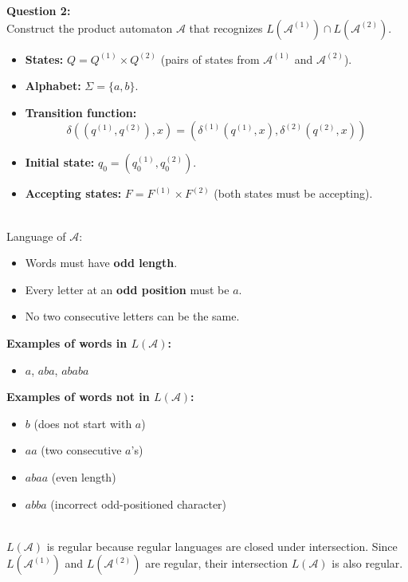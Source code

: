 \documentclass{article}
\theoremstyle{theorem}
\theoremstyle{definition}
\theoremstyle{remark}
\begin{document}
\smallskip

\textbf{Question 2: } \\ 
Construct the product automaton \( \mathcal{A} \) that recognizes \( L(\mathcal{A}^{(1)}) \cap L(\mathcal{A}^{(2)}) \).

\begin{itemize}
    \item \textbf{States:} \( Q = Q^{(1)} \times Q^{(2)} \) (pairs of states from \( \mathcal{A}^{(1)} \) and \( \mathcal{A}^{(2)} \)).
    \item \textbf{Alphabet:} \( \Sigma = \{a, b\} \).
    \item \textbf{Transition function:} 
    \[
    \delta((q^{(1)}, q^{(2)}), x) = (\delta^{(1)}(q^{(1)}, x), \delta^{(2)}(q^{(2)}, x))
    \]
    \item \textbf{Initial state:} \( q_0 = (q_0^{(1)}, q_0^{(2)}) \).
    \item \textbf{Accepting states:} \( F = F^{(1)} \times F^{(2)} \) (both states must be accepting).
\end{itemize} \\

Language of \( \mathcal{A} \):

\begin{itemize}
    \item Words must have \textbf{odd length}.
    \item Every letter at an \textbf{odd position} must be \( a \).
    \item No two consecutive letters can be the same.
\end{itemize}

\textbf{Examples of words in \( L(\mathcal{A}) \):}
\begin{itemize}
    \item \( a \), \( aba \), \( ababa \)
\end{itemize}

\textbf{Examples of words not in \( L(\mathcal{A}) \):}
\begin{itemize}
    \item \( b \) (does not start with \( a \))
    \item \( aa \) (two consecutive \( a \)'s)
    \item \( abaa \) (even length)
    \item \( abba \) (incorrect odd-positioned character)
\end{itemize} \\ 

\( L(\mathcal{A}) \) is regular because regular languages are closed under intersection. Since \( L(\mathcal{A}^{(1)}) \) and \( L(\mathcal{A}^{(2)}) \) are regular, their intersection \( L(\mathcal{A}) \) is also regular.
\end{document}
